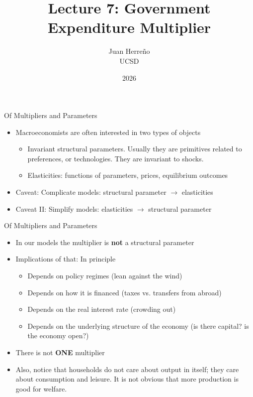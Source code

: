\documentclass[11pt,aspectratio=169,xcolor={dvipsnames},hyperref={pdftex,pdfpagemode=UseNone,hidelinks,pdfdisplaydoctitle=true},usepdftitle=false]{beamer}
\title{Lecture 7: Government Expenditure Multiplier}
\author{Juan Herre\~{n}o\\UCSD}
\date{2026}
\begin{document}
\maketitle


\begin{frame}{Of Multipliers and Parameters}
\begin{itemize}
\item Macroeconomists are often interested in two types of objects
\begin{itemize}
\item Invariant structural parameters. Usually they are primitives related to preferences, or technologies. They are invariant to shocks.
\item Elasticities: functions of parameters, prices, equilibrium outcomes
\end{itemize}
\item Caveat: Complicate models: structural parameter $\rightarrow$ elasticities
\item Caveat II: Simplify models: elasticities $\rightarrow$ structural parameter
\end{itemize}
\end{frame}


\begin{frame}{Of Multipliers and Parameters}
\begin{itemize}
\item In our models the multiplier is \textbf{not} a structural parameter
\item Implications of that: In principle
\begin{itemize}
\item Depends on policy regimes (lean against the wind)
\item Depends on how it is financed (taxes vs. transfers from abroad)
\item Depends on the real interest rate (crowding out)
\item Depends on the underlying structure of the economy (is there capital? is the economy open?)
\end{itemize}
\item There is not \textbf{ONE} multiplier
\item Also, notice that households do not care about output in itself; they care about consumption and leisure. It is not obvious that more production is good for welfare.
\end{itemize}
\end{frame}
\end{document}
